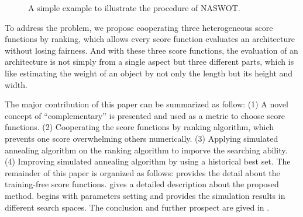 \documentclass[sigconf]{acmart}
\begin{document}
    \begin{figure*}[b]
        \vspace{-\baselineskip}
        \caption{A simple example to illustrate the procedure of NASWOT.}
        \label{fig:naswot}
        \centering
        \vspace{-\baselineskip}
    \end{figure*}
    To address the problem, we propose cooperating three heterogeneous 
    score functions by ranking, which allows every score function 
    evaluates an architecture without losing fairness. 
    And with these three score functions, the evaluation of an 
    architecture is not simply from a single aspect but three different 
    parts, which is like estimating the weight of an object by not only 
    the length but its height and width. 

    The major contribution of this paper can be summarized as follow:
    (1) A novel concept of ``complementary'' is presented and used as 
    a metric to choose score functions. 
    (2) Cooperating the score functions by ranking algorithm, 
    which prevents one score overwhelming others numerically. 
    (3) Applying simulated annealing algorithm on the ranking algorithm 
    to imporve the searching ability. 
    (4) Improving simulated annealing algorithm by using a historical 
    best set. 
    The remainder of this paper is organized as follows: 
     provides the detail about the training-free 
    score functions. 
     gives a detailed description about the proposed method. 
     begins with parameters setting and provides the 
    simulation results in different search spaces. 
    The conclusion and further prospect are gived in .
\end{document}
